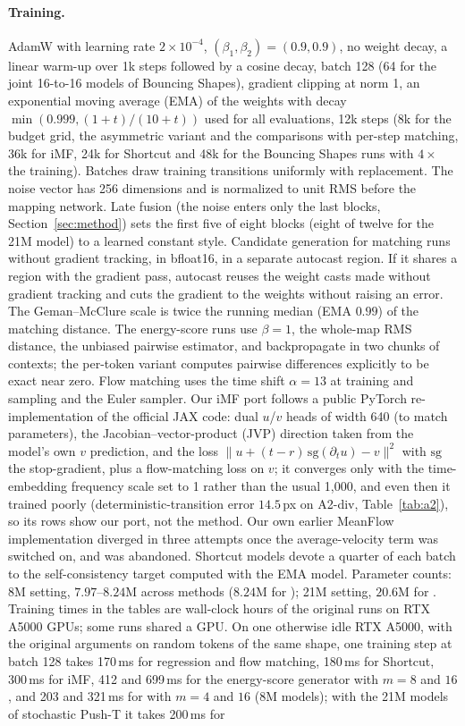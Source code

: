 \paragraph{Training.}
AdamW with learning rate $2\times10^{-4}$, $(\beta_1, \beta_2) = (0.9, 0.9)$, no weight decay, a linear warm-up over 1k steps followed by a cosine decay, batch 128 (64 for the joint 16-to-16 models of Bouncing Shapes), gradient clipping at norm 1, an exponential moving average (EMA) of the weights with decay $\min(0.999, (1 + t)/(10 + t))$ used for all evaluations, 12k steps (8k for the budget grid, the asymmetric variant and the comparisons with per-step matching, 36k for iMF, 24k for Shortcut and 48k for the Bouncing Shapes runs with $4\times$ the training). Batches draw training transitions uniformly with replacement. The noise vector has 256 dimensions and is normalized to unit RMS before the mapping network. Late fusion (the noise enters only the last blocks, Section~\ref{sec:method}) sets the first five of eight blocks (eight of twelve for the 21M model) to a learned constant style. Candidate generation for matching runs without gradient tracking, in bfloat16, in a separate autocast region. If it shares a region with the gradient pass, autocast reuses the weight casts made without gradient tracking and cuts the gradient to the weights without raising an error. The Geman--McClure scale is twice the running median (EMA $0.99$) of the matching distance. The energy-score runs use $\beta = 1$, the whole-map RMS distance, the unbiased pairwise estimator, and backpropagate in two chunks of contexts; the per-token variant computes pairwise differences explicitly to be exact near zero. Flow matching uses the time shift $\alpha = 13$ at training and sampling and the Euler sampler. Our iMF port follows a public PyTorch re-implementation of the official JAX code: dual $u$/$v$ heads of width 640 (to match parameters), the Jacobian--vector-product (JVP) direction taken from the model's own $v$ prediction, and the loss $\|u + (t - r)\,\mathrm{sg}(\partial_t u) - v\|^2$ with $\mathrm{sg}$ the stop-gradient, plus a flow-matching loss on $v$; it converges only with the time-embedding frequency scale set to 1 rather than the usual 1{,}000, and even then it trained poorly (deterministic-transition error $14.5$\,px on A2-div, Table~\ref{tab:a2}), so its rows show our port, not the method. Our own earlier MeanFlow implementation diverged in three attempts once the average-velocity term was switched on, and was abandoned. Shortcut models devote a quarter of each batch to the self-consistency target computed with the EMA model. Parameter counts: 8M setting, $7.97$--$8.24$M across methods ($8.24$M for \imlewm{}); 21M setting, $20.6$M for \imlewm{}. Training times in the tables are wall-clock hours of the original runs on RTX A5000 GPUs; some runs shared a GPU. On one otherwise idle RTX A5000, with the original arguments on random tokens of the same shape, one training step at batch 128 takes 170\,ms for regression and flow matching, 180\,ms for Shortcut, 300\,ms for iMF, 412 and 699\,ms for the energy-score generator with $m = 8$ and $16$, and 203 and 321\,ms for \imlewm{} with $m = 4$ and $16$ (8M models); with the 21M models of stochastic Push-T it takes 200\,ms for 